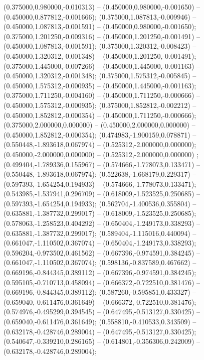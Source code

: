  (0.375000,0.980000,-0.010313) -- (0.450000,0.980000,-0.001650) -- (0.450000,0.877812,-0.001666);
 (0.375000,1.087813,-0.009946) -- (0.450000,1.087813,-0.001591) -- (0.450000,0.980000,-0.001650);
 (0.375000,1.201250,-0.009316) -- (0.450000,1.201250,-0.001491) -- (0.450000,1.087813,-0.001591);
 (0.375000,1.320312,-0.008423) -- (0.450000,1.320312,-0.001348) -- (0.450000,1.201250,-0.001491);
 (0.375000,1.445000,-0.007266) -- (0.450000,1.445000,-0.001163) -- (0.450000,1.320312,-0.001348);
 (0.375000,1.575312,-0.005845) -- (0.450000,1.575312,-0.000935) -- (0.450000,1.445000,-0.001163);
 (0.375000,1.711250,-0.004160) -- (0.450000,1.711250,-0.000666) -- (0.450000,1.575312,-0.000935);
 (0.375000,1.852812,-0.002212) -- (0.450000,1.852812,-0.000354) -- (0.450000,1.711250,-0.000666);
 (0.375000,2.000000,0.000000) -- (0.450000,2.000000,0.000000) -- (0.450000,1.852812,-0.000354);
 (0.474983,-1.900159,0.078871) -- (0.550448,-1.893618,0.067974) -- (0.525312,-2.000000,0.000000);
 (0.450000,-2.000000,0.000000) -- (0.525312,-2.000000,0.000000) ;
 (0.499404,-1.789336,0.155967) -- (0.574666,-1.778073,0.133471) -- (0.550448,-1.893618,0.067974);
 (0.522638,-1.668179,0.229317) -- (0.597393,-1.654254,0.194933) -- (0.574666,-1.778073,0.133471);
 (0.543985,-1.537941,0.296709) -- (0.618009,-1.523525,0.250685) -- (0.597393,-1.654254,0.194933);
 (0.562704,-1.400536,0.355804) -- (0.635881,-1.387732,0.299017) -- (0.618009,-1.523525,0.250685);
 (0.578063,-1.258523,0.404292) -- (0.650404,-1.249173,0.338293) -- (0.635881,-1.387732,0.299017);
 (0.589404,-1.115016,0.440094) -- (0.661047,-1.110502,0.367074) -- (0.650404,-1.249173,0.338293);
 (0.596204,-0.973502,0.461562) -- (0.667396,-0.974591,0.384245) -- (0.661047,-1.110502,0.367074);
 (0.598136,-0.837589,0.467662) -- (0.669196,-0.844345,0.389112) -- (0.667396,-0.974591,0.384245);
 (0.595105,-0.710713,0.458094) -- (0.666372,-0.722510,0.381476) -- (0.669196,-0.844345,0.389112);
 (0.587260,-0.595851,0.433327) -- (0.659040,-0.611476,0.361649) -- (0.666372,-0.722510,0.381476);
 (0.574976,-0.495299,0.394545) -- (0.647495,-0.513127,0.330425) -- (0.659040,-0.611476,0.361649);
 (0.558810,-0.410533,0.343509) -- (0.632178,-0.428746,0.289004) -- (0.647495,-0.513127,0.330425);
 (0.540647,-0.339210,0.286165) -- (0.614801,-0.356306,0.242009) -- (0.632178,-0.428746,0.289004);
